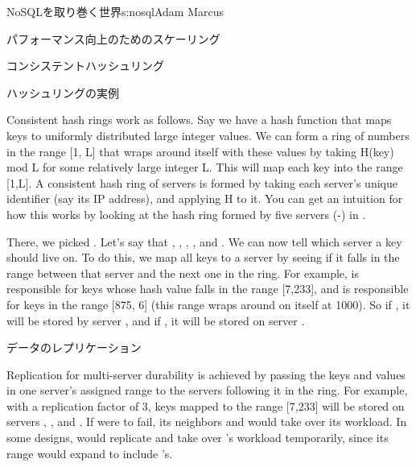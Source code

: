 \begin{aosachapter}{NoSQLを取り巻く世界}{s:nosql}{Adam Marcus}
\begin{aosasect1}{パフォーマンス向上のためのスケーリング}
\begin{aosasect2}{コンシステントハッシュリング}
\begin{aosasect3}{ハッシュリングの実例}


Consistent hash rings work as follows.  Say we have a hash function
 that maps keys to uniformly distributed large integer values.  We
can form a ring of numbers in the range [1, L] that wraps around
itself with these values by taking H(key) mod L for some relatively
large integer L\@.  This will map each key into the range [1,L].  A
consistent hash ring of servers is formed by taking each server's
unique identifier (say its IP address), and applying H to it.  You can
get an intuition for how this works by looking at the hash ring formed
by five servers (-) in .

There, we picked .  Let's say that , , , , and .  We can now tell which
server a key should live on.  To do this, we map all keys to a server
by seeing if it falls in the range between that server and the next
one in the ring.  For example,  is responsible for keys whose
hash value falls in the range [7,233], and  is responsible for
keys in the range [875, 6] (this range wraps around on itself at
1000).  So if , it will be stored by
server , and if , it will be
stored on server .

\end{aosasect3}

\begin{aosasect3}{データのレプリケーション}

Replication for multi-server durability is achieved by passing the
keys and values in one server's assigned range to the servers
following it in the ring.  For example, with a replication factor of
3, keys mapped to the range [7,233] will be stored on servers
, , and .  If  were to fail, its
neighbors  and  would take over its workload.  In some designs,
 would replicate and take over 's workload temporarily, 
since its range would expand to include 's.


\end{aosasect3}
\end{aosasect2}
\end{aosasect1}
\end{aosachapter}
